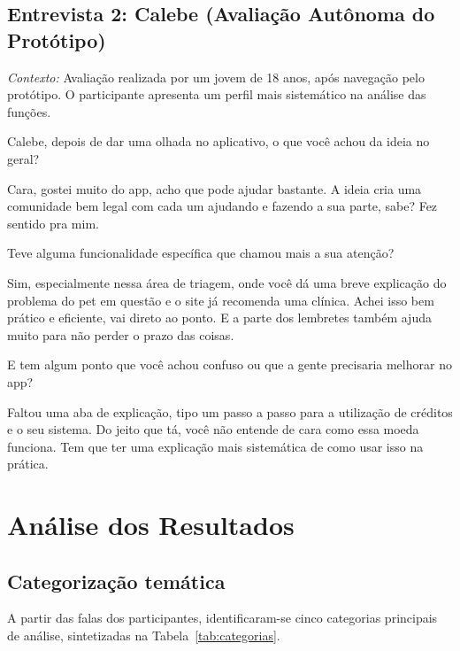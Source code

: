 \documentclass[12pt,a4paper]{article}
\newenvironment{turnos}
  {\begin{list}{}{%
     \setlength{\leftmargin}{2.2cm}%
     \setlength{\labelwidth}{2.0cm}%
     \setlength{\labelsep}{0.2cm}%
     \setlength{\itemsep}{0.6em}%
     \setlength{\parsep}{0pt}}}
  {\end{list}}
\newcommand{\fala}[1]{\item[\textbf{#1}\hfill]}
\begin{document}
\begin{turnos}
\subsection{Entrevista 2: Calebe (Avaliação Autônoma do Protótipo)}

\noindent\textit{Contexto:} Avaliação realizada por um jovem de 18 anos, após navegação pelo protótipo. O participante apresenta um perfil mais sistemático na análise das funções.


\fala{E:} Calebe, depois de dar uma olhada no aplicativo, o que você achou da ideia no geral?

\fala{P:} Cara, gostei muito do app, acho que pode ajudar bastante. A ideia cria uma comunidade bem legal com cada um ajudando e fazendo a sua parte, sabe? Fez sentido pra mim.

\fala{E:} Teve alguma funcionalidade específica que chamou mais a sua atenção?

\fala{P:} Sim, especialmente nessa área de triagem, onde você dá uma breve explicação do problema do pet em questão e o site já recomenda uma clínica. Achei isso bem prático e eficiente, vai direto ao ponto. E a parte dos lembretes também ajuda muito para não perder o prazo das coisas.

\fala{E:} E tem algum ponto que você achou confuso ou que a gente precisaria melhorar no app?

\fala{P:} Faltou uma aba de explicação, tipo um passo a passo para a utilização de créditos e o seu sistema. Do jeito que tá, você não entende de cara como essa moeda funciona. Tem que ter uma explicação mais sistemática de como usar isso na prática.

\end{turnos}

\section{Análise dos Resultados}

\subsection{Categorização temática}

A partir das falas dos participantes, identificaram-se cinco categorias principais de análise, sintetizadas
na Tabela~\ref{tab:categorias}.
\end{document}
